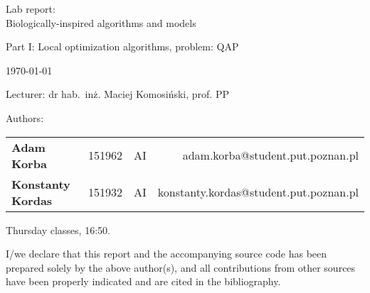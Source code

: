 \thispagestyle{empty} %

\begin{center}
{\large{Lab report:\\
Biologically-inspired algorithms and models
}}

\vspace{3ex}

Part I: Local optimization algorithms, problem: QAP

\vspace{3ex}
{\footnotesize\today}

\end{center}


\vspace{10ex}

Lecturer: dr hab.~inż. Maciej Komosiński, prof. PP

\vspace{5ex}

Authors:
\begin{tabular}{lllr}
\textbf{Adam Korba} & 151962 & AI & adam.korba@student.put.poznan.pl \\
\textbf{Konstanty Kordas} & 151932 & AI & konstanty.kordas@student.put.poznan.pl \\
\end{tabular}

\vspace{5ex}

Thursday classes, 16:50.

\vspace{35ex}

\noindent I/we declare that this report and the accompanying source code has been prepared solely by the above author(s), and all contributions from other sources have been properly indicated and are cited in the bibliography.  

\newpage
